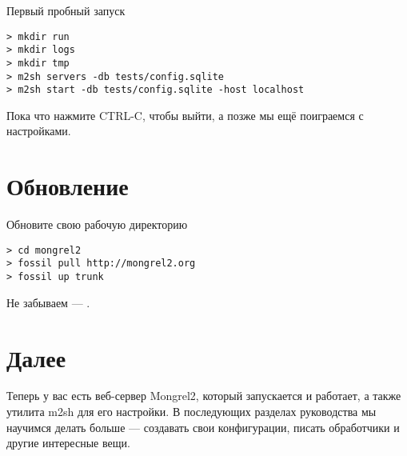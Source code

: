 \begin{code}{Первый пробный запуск}
\begin{lstlisting}
> mkdir run
> mkdir logs
> mkdir tmp
> m2sh servers -db tests/config.sqlite
> m2sh start -db tests/config.sqlite -host localhost
\end{lstlisting}
\end{code}

Пока что нажмите CTRL-C, чтобы выйти, а позже мы ещё поиграемся с настройками.

\section{Обновление}
\begin{code}{Обновите свою рабочую директорию}
\begin{lstlisting}
> cd mongrel2
> fossil pull http://mongrel2.org
> fossil up trunk
\end{lstlisting}
\end{code}

Не забываем --- .


\section{Далее}

Теперь у вас есть веб-сервер Mongrel2, который запускается и работает, а также
утилита m2sh для его настройки. В последующих разделах руководства мы
научимся делать больше --- создавать свои конфигурации, писать
обработчики и другие интересные вещи.
